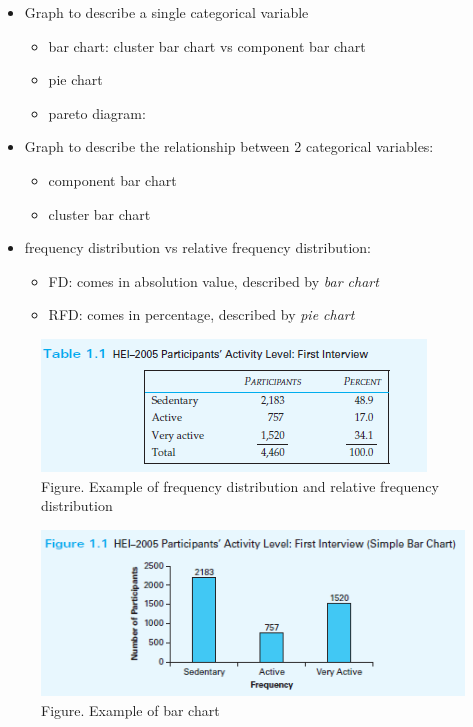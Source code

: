 \documentclass[
]{article}
\providecommand{\tightlist}{%
  \setlength{\itemsep}{0pt}\setlength{\parskip}{0pt}}
\begin{document}
\begin{itemize}
\tightlist
\item
  Graph to describe a single categorical variable

  \begin{itemize}
  \tightlist
  \item
    bar chart: cluster bar chart vs component bar chart
  \item
    pie chart
  \item
    pareto diagram:
  \end{itemize}
\item
  Graph to describe the relationship between 2 categorical variables:

  \begin{itemize}
  \tightlist
  \item
    component bar chart
  \item
    cluster bar chart
  \end{itemize}
\item
  frequency distribution vs relative frequency distribution:

  \begin{itemize}
  \tightlist
  \item
    FD: comes in absolution value, described by \emph{bar chart}
  \item
    RFD: comes in percentage, described by \emph{pie chart}
  \end{itemize}
\end{itemize}

\begin{figure}
\centering
\includegraphics{assets/image/C1-frequencydistributiontable.PNG}
\caption{Figure. Example of frequency distribution and relative
frequency distribution}
\end{figure}

\begin{figure}
\centering
\includegraphics{assets/image/C1-barcharttodescribecategoricaldata.PNG}
\caption{Figure. Example of bar chart}
\end{figure}
\end{document}
